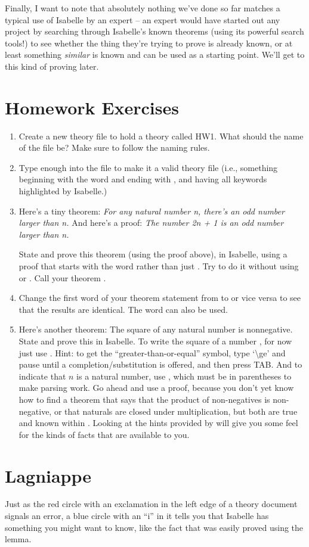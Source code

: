 Finally, I want to note that absolutely nothing we've done so far matches a typical use of Isabelle by an expert -- an expert would have started out any project by searching through Isabelle's known theorems (using its powerful search tools!) to see whether the thing they're trying to prove is already known, or at least something \textit{similar} is known and can be used as a starting point. We'll get to this kind of proving later. 

\section{Homework Exercises}

\begin{enumerate}
    \item Create a new theory file to hold a theory called HW1. What should the name of the file be? Make sure to follow the naming rules.
    \item Type enough into the file to make it a valid theory file (i.e., something beginning with the word  and ending with , and having all keywords highlighted by Isabelle.)
    \item Here's a tiny theorem: \textit{For any natural number n, there's an odd number larger than n. }And here's a proof:\textit{ The number 2n + 1 is an odd number larger than n. }

State and prove this theorem (using the proof above), in Isabelle, using a proof that starts with the word  rather than just . Try to do it without using  or . Call your theorem . 

\item Change the first word of your theorem statement from  to  or vice versa to see that the results are identical. The word  can also be used. 
 
\item Here's another theorem: The square of any natural number is nonnegative. State and prove this in Isabelle. To write the square of a number , for now just use . Hint: to get the ``greater-than-or-equal'' symbol, type `\textbackslash{}ge' and pause until a completion/substitution is offered, and then press TAB. And to indicate that $n$ is a natural number, use , which must be in parentheses to make parsing work. Go ahead and use a  proof, because you don't yet know how to find a theorem that says that the product of non-negatives is non-negative, or that naturals are closed under multiplication, but both are true and known within . Looking at the hints provided by  will give you some feel for the kinds of facts that are available to you. 
\end{enumerate}

\section{Lagniappe}

Just as the red circle with an exclamation in the left edge of a theory document signals an error, a blue circle with an ``i'' in it tells you that Isabelle has something you might want to know, like the fact that  was easily proved using the  lemma. 

 
